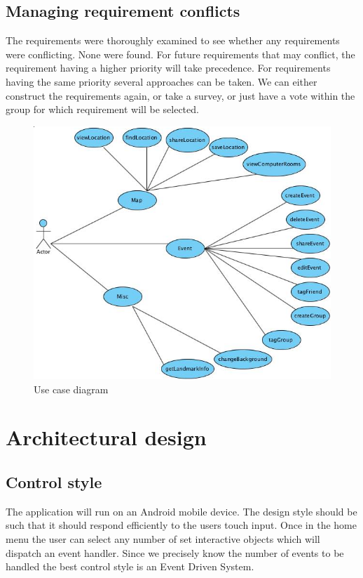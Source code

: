 \documentclass[10pt,a4paper,oneside]{report}
\begin{document}
\subsection*{Managing requirement conflicts}
The requirements were thoroughly examined to see whether any requirements were conflicting. None were found. For future requirements that may conflict, the requirement having a higher priority will take precedence. For requirements having the same priority several approaches can be taken. We can either construct the requirements again, or take a survey, or just have a vote within the group for which requirement will be selected.

\begin{figure}[H]
 \centering
 \includegraphics[keepaspectratio, width=\textwidth]{usecase.png}
 \caption{Use case diagram}
\end{figure}

\section*{Architectural design}
\subsection*{Control style}
The application will run on an Android mobile device. The design style should be such that it should respond efficiently to the users touch input.  Once in the home menu the user can select any number of set interactive objects which will dispatch an event handler. Since we precisely know the number of events to be handled the best control style is an Event Driven System.
\end{document}
